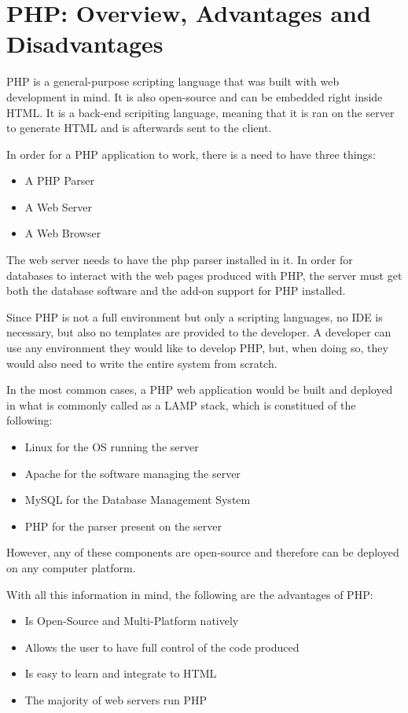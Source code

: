 \section{PHP: Overview, Advantages and Disadvantages}
PHP is a general-purpose scripting language that was built with web development in mind. It is also open-source and can be embedded right inside HTML. It is a back-end scripiting language, meaning that it is ran on the server to generate HTML and is afterwards sent to the client.

In order for a PHP application to work, there is a need to have three things:
\begin{itemize}
  \item A PHP Parser
  \item A Web Server
  \item A Web Browser
\end{itemize}

The web server needs to have the php parser installed in it. In order for databases to interact with the web pages produced with PHP, the server must get both the database software and the add-on support for PHP installed.

Since PHP is not a full environment but only a scripting languages, no IDE is necessary, but also no templates are provided to the developer. A developer can use any environment they would like to develop PHP, but, when doing so, they would also need to write the entire system from scratch.

In the most common cases, a PHP web application would be built and deployed in what is commonly called as a LAMP stack, which is constitued of the following:
\begin{itemize}
  \item Linux for the OS running the server
  \item Apache for the software managing the server
  \item MySQL for the Database Management System
  \item PHP for the parser present on the server
\end{itemize}

However, any of these components are open-source and therefore can be deployed on any computer platform.

With all this information in mind, the following are the advantages of PHP:
\begin{itemize}
  \item Is Open-Source and Multi-Platform natively
  \item Allows the user to have full control of the code produced
  \item Is easy to learn and integrate to HTML
  \item The majority of web servers run PHP
\end{itemize}

